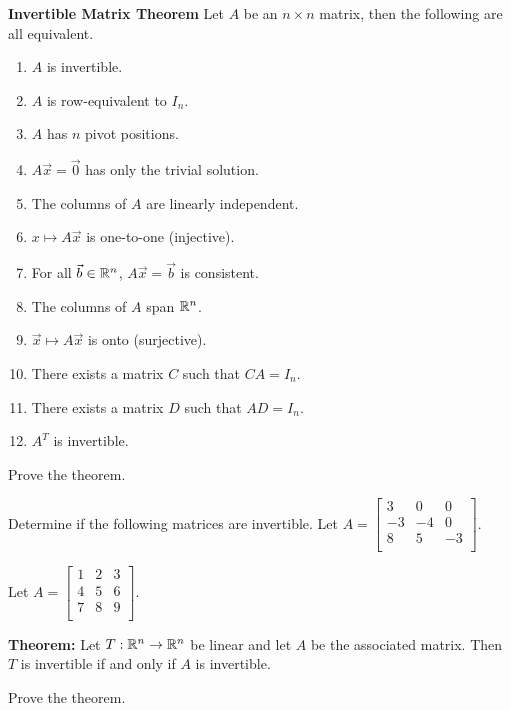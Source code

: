 \begin{enumerate}
{\bf Invertible Matrix Theorem} Let $A$ be an $n \times n$ matrix, then the following are all equivalent.
\begin{enumerate}
\item $A$ is invertible.
\item $A$ is row-equivalent to $I_n$.
\item $A$ has $n$ pivot positions.
\item $A\vec{x}=\vec{0}$ has only the trivial solution.
\item The columns of $A$ are linearly independent.
\item $x\mapsto A\vec{x}$ is one-to-one (injective).
\item For all $\vec{b}\in \mathbb{R}^n$, $A\vec{x}=\vec{b}$ is consistent.
\item The columns of $A$ span $\mathbb{R}^n$.
\item $\vec{x} \mapsto A\vec{x}$ is onto (surjective).
\item There exists a matrix $C$ such that $CA=I_n$.
\item There exists a matrix $D$ such that $AD=I_n$.
\item $A^{T}$ is invertible.
\end{enumerate}

\Problem Prove the theorem.

\newpage

\Problem Determine if the following matrices are invertible.
\Part Let $A=\begin{bmatrix}
3 & 0 & 0\\
-3 &-4 & 0\\
8 & 5 & -3\\
\end{bmatrix}$.

\vfill

\Part Let $A=\begin{bmatrix}
1 &2 & 3\\
4 &5 & 6\\
7 & 8 & 9\\
\end{bmatrix}$.

\vfill

\newpage

{\bf Theorem:} Let $T: \mathbb{R}^n \to \mathbb{R}^n$ be linear and let $A$ be the associated matrix. Then $T$ is invertible if and only if $A$ is invertible.

\Problem Prove the theorem.
 

\end{enumerate}

